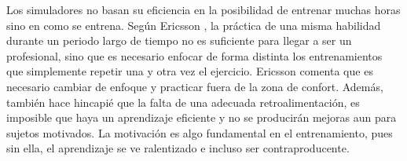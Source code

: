 





Los simuladores no basan su eficiencia en la posibilidad de entrenar muchas horas sino en como se entrena. Según Ericsson \cite{ericsson1993role}, la práctica de una misma habilidad durante un periodo largo de tiempo no es suficiente para llegar a ser un profesional, sino que es necesario enfocar de forma distinta los entrenamientos que simplemente repetir una y otra vez el ejercicio. Ericsson comenta que es necesario cambiar de enfoque y practicar fuera de la zona de confort. Además, también hace hincapié que la falta de una adecuada retroalimentación, es imposible que haya un aprendizaje eficiente y no se producirán mejoras aun para sujetos motivados. La motivación es algo fundamental en el entrenamiento, pues sin ella, el aprendizaje se ve ralentizado e incluso ser contraproducente. 

